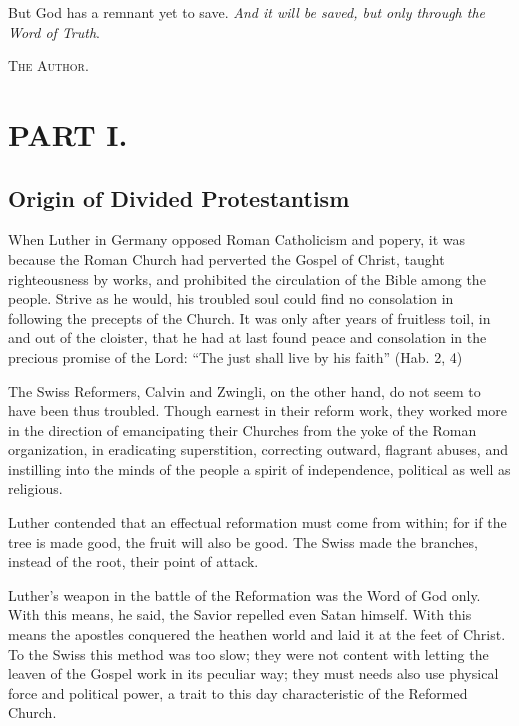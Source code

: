 \documentclass[
]{book}
\begin{document}
But God has a remnant yet to save. \emph{And it will be saved, but only through the Word of Truth}.

\textsc{The Author.}

\hypertarget{part-i.}{%
\chapter*{PART I.}\label{part-i.}}

\hypertarget{origin-of-divided-protestantism}{%
\section{Origin of Divided Protestantism}\label{origin-of-divided-protestantism}}

When Luther in Germany opposed Roman Catholicism and popery, it was because the Roman Church had perverted the Gospel of Christ, taught righteousness by works, and prohibited the circulation of the Bible among the people. Strive as he would, his troubled soul could find no consolation in following the precepts of the Church. It was only after years of fruitless toil, in and out of the cloister, that he had at last found peace and consolation in the precious promise of the Lord: ``The just shall live by his faith'' (Hab. 2, 4)

The Swiss Reformers, Calvin and Zwingli, on the other hand, do not seem to have been thus troubled. Though earnest in their reform work, they worked more in the direction of emancipating their Churches from the yoke of the Roman organization, in eradicating superstition, correcting outward, flagrant abuses, and instilling into the minds of the people a spirit of independence, political as well as religious.

Luther contended that an effectual reformation must come from within; for if the tree is made good, the fruit will also be good. The Swiss made the branches, instead of the root, their point of attack.

Luther's weapon in the battle of the Reformation was the Word of God only. With this means, he said, the Savior repelled even Satan himself. With this means the apostles conquered the heathen world and laid it at the feet of Christ. To the Swiss this method was too slow; they were not content with letting the leaven of the Gospel work in its peculiar way; they must needs also use physical force and political power, a trait to this day characteristic of the Reformed Church.
\end{document}

